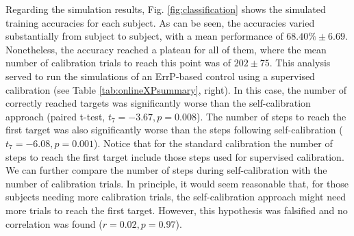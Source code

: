 \documentclass[10pt,letterpaper]{article}
\begin{document}
	\begin{figure*}[htbp]
		\centering
		\caption{\textbf{Signal and accuracy comparison with standard calibration.} (a) Difference average (error minus correct grand averages) at channel FCz for the 3 subjects that performed the standard calibration and self-calibration protocols. (b) Online mean classification accuracy ($\pm$ std) of the three subjects after following each calibration procedure, together with the number of calibration trials used for training in the standard calibration approach.}
		\label{fig:std_vs_sc}
	\end{figure*}
	
	Regarding the simulation results, Fig. \ref{fig:classification} shows the simulated training accuracies for each subject. As can be seen, the accuracies varied substantially from subject to subject, with a mean performance of $68.40\% \pm 6.69$. Nonetheless, the accuracy reached a plateau for all of them, where the mean number of calibration trials to reach this point was of $202 \pm 75$. This analysis served to run the simulations of an ErrP-based control using a supervised calibration (see Table \ref{tab:onlineXPsummary}, right). In this case, the number of correctly reached targets was significantly worse than the self-calibration approach (paired t-test, $t_{7} = -3.67, p=0.008$). The number of steps to reach the first target was also significantly worse than the steps following self-calibration ($t_{7} = -6.08, p=0.001$). Notice that for the standard calibration the number of steps to reach the first target include those steps used for supervised calibration. We can further compare the number of steps during self-calibration with the number of calibration trials. In principle, it would seem reasonable that, for those subjects needing more calibration trials, the self-calibration approach might need more trials to reach the first target. However, this hypothesis was falsified and no correlation was found ($r=0.02, p=0.97$).
	
	\begin{figure*}[htbp]
		\centering
		\caption{\textbf{Accuracy from simulated standard calibration}. Simulated calibration represented as accuracies computed by increasing the number of trials of the training dataset (x-axis) and testing the classifier with a fixed test set of 200 trials. In order to have a confidence measure (shadowed areas), this procedure was repeated 10 times while shuffling the data. The horizontal solid line represents the accuracy plateau (also shown above the line), whereas the dashed vertical line shows the number of trials needed to reach the plateau.}
		\label{fig:classification}
	\end{figure*}
\end{document}
